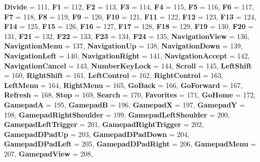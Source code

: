 \begin{DoxyCompactItemize}
{\bfseries Divide} = 111, 
{\bfseries F1} = 112, 
\newline
{\bfseries F2} = 113, 
{\bfseries F3} = 114, 
{\bfseries F4} = 115, 
{\bfseries F5} = 116, 
\newline
{\bfseries F6} = 117, 
{\bfseries F7} = 118, 
{\bfseries F8} = 119, 
{\bfseries F9} = 120, 
\newline
{\bfseries F10} = 121, 
{\bfseries F11} = 122, 
{\bfseries F12} = 123, 
{\bfseries F13} = 124, 
\newline
{\bfseries F14} = 125, 
{\bfseries F15} = 126, 
{\bfseries F16} = 127, 
{\bfseries F17} = 128, 
\newline
{\bfseries F18} = 129, 
{\bfseries F19} = 130, 
{\bfseries F20} = 131, 
{\bfseries F21} = 132, 
\newline
{\bfseries F22} = 133, 
{\bfseries F23} = 134, 
{\bfseries F24} = 135, 
{\bfseries Navigation\+View} = 136, 
\newline
{\bfseries Navigation\+Menu} = 137, 
{\bfseries Navigation\+Up} = 138, 
{\bfseries Navigation\+Down} = 139, 
{\bfseries Navigation\+Left} = 140, 
\newline
{\bfseries Navigation\+Right} = 141, 
{\bfseries Navigation\+Accept} = 142, 
{\bfseries Navigation\+Cancel} = 143, 
{\bfseries Number\+Key\+Lock} = 144, 
\newline
{\bfseries Scroll} = 145, 
{\bfseries Left\+Shift} = 160, 
{\bfseries Right\+Shift} = 161, 
{\bfseries Left\+Control} = 162, 
\newline
{\bfseries Right\+Control} = 163, 
{\bfseries Left\+Menu} = 164, 
{\bfseries Right\+Menu} = 165, 
{\bfseries Go\+Back} = 166, 
\newline
{\bfseries Go\+Forward} = 167, 
{\bfseries Refresh} = 168, 
{\bfseries Stop} = 169, 
{\bfseries Search} = 170, 
\newline
{\bfseries Favorites} = 171, 
{\bfseries Go\+Home} = 172, 
{\bfseries GamepadA} = 195, 
{\bfseries GamepadB} = 196, 
\newline
{\bfseries GamepadX} = 197, 
{\bfseries GamepadY} = 198, 
{\bfseries Gamepad\+Right\+Shoulder} = 199, 
{\bfseries Gamepad\+Left\+Shoulder} = 200, 
\newline
{\bfseries Gamepad\+Left\+Trigger} = 201, 
{\bfseries Gamepad\+Right\+Trigger} = 202, 
{\bfseries Gamepad\+D\+Pad\+Up} = 203, 
{\bfseries Gamepad\+D\+Pad\+Down} = 204, 
\newline
{\bfseries Gamepad\+D\+Pad\+Left} = 205, 
{\bfseries Gamepad\+D\+Pad\+Right} = 206, 
{\bfseries Gamepad\+Menu} = 207, 
{\bfseries Gamepad\+View} = 208, 

\end{DoxyCompactItemize}
